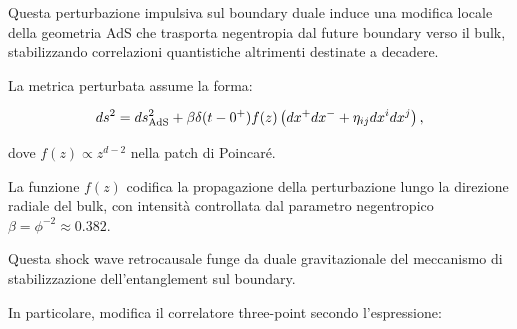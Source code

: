 \documentclass[11pt,a4paper]{article}
\theoremstyle{plain}
\theoremstyle{definition}
\begin{document}
\vspace{0.5cm}



Questa perturbazione impulsiva sul boundary duale induce una modifica locale della geometria AdS che trasporta negentropia dal future boundary verso il bulk, stabilizzando correlazioni quantistiche altrimenti destinate a decadere.

\clearpage

La metrica perturbata assume la forma:

\vspace{0.2cm}

\begin{tcolorbox}[
  colback=blue!3!white, 
  colframe=blue!80!black, 
  title=Shock wave retrocausale nel bulk AdS, 
  fonttitle=\bfseries,
  breakable,
  enhanced,
  width=\textwidth,
  boxrule=0.9pt,
  arc=6pt
]
\begin{equation}
ds^2 = ds^2_{\rm AdS} + \beta \delta(t-0^+) f(z) \left( dx^+ dx^- + \eta_{ij} dx^i dx^j \right),
\label{eq:ads_shock_wave}
\end{equation}
\end{tcolorbox}



\vspace{0.3cm}

dove $f(z) \propto z^{d-2}$ nella patch di Poincaré.

\vspace{0.3cm}


La funzione $f(z)$ codifica la propagazione della perturbazione lungo la direzione radiale del bulk, con intensità controllata dal parametro negentropico $\beta = \phi^{-2} \approx 0.382$.

\vspace{0.4cm}

Questa shock wave retrocausale funge da duale gravitazionale del meccanismo di stabilizzazione dell’entanglement sul boundary. 


\vspace{0.7cm}


In particolare, modifica il correlatore three-point secondo l’espressione:

\vspace{0.2cm}
\end{document}
